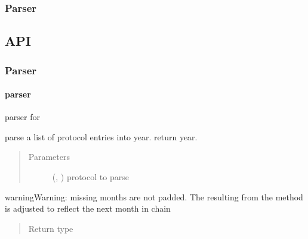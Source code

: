 \documentclass[letterpaper,10pt,english]{sphinxmanual}
\begin{document}
\subsubsection{Parser}
\label{\detokenize{devmanual:parser}}

\subsection{API}
\label{\detokenize{devmanual:api}}

\subsubsection{Parser}
\label{\detokenize{devmanual:id2}}

\paragraph{parser}
\label{\detokenize{devmanual:id3}}\label{\detokenize{devmanual:module-parser}}
parser for 

\begin{fulllineitems}
\label{\detokenize{devmanual:parser.parse_csv_protocol}}
parse a list of  protocol entries into year. return year.
\begin{quote}\begin{description}
\item[{Parameters}] \leavevmode
{} (\sphinxcode{Union}{[}, \sphinxcode{tuple}{]}) \textendash{} protocol to parse

\end{description}\end{quote}

\begin{sphinxadmonition}{warning}{Warning:}
missing months are not padded. The {\hyperref[\detokenize{devmanual:protocol.Month}]{}}
resulting from the {\hyperref[\detokenize{devmanual:protocol.Month.get_next}]{}} method 
is adjusted to reflect the next month in chain
\end{sphinxadmonition}
\begin{quote}\begin{description}
\item[{Return type}] \leavevmode
{}

\end{description}\end{quote}

\end{fulllineitems}
\end{document}
